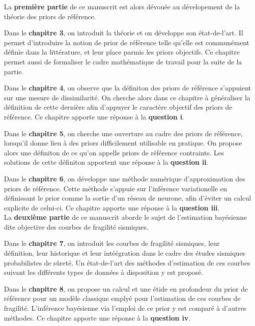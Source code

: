 



La \textbf{première partie} de ce manuscrit est alors dévouée au dévelopement de la théorie des priors de référence.

\noindent
Dans le \textbf{chapitre 3}, on introduit la théorie et on développe son état-de-l'art. Il permet d'introduire la notion de prior de référence telle qu'elle est communément définie dans la littérature, et leur place parmis les priors objectifs. Ce chapitre permet aussi de formaliser le cadre mathématique de travail pour la suite de la partie.

\noindent
Dans le \textbf{chapitre 4}, on observe que la définiton des priors de référence s'appuient sur une mesure de dissimilarité. On cherche alors dans ce chapitre à généraliser la définition de cette dernière afin d'appuyer le caractère objectif des priors de référence. Ce chapitre apporte une réponse à la \textbf{question i}.

\noindent
Dans le \textbf{chapitre 5}, on cherche une ouverture au cadre des priors de référence, lorsqu'il donne lieu à des priors difficilement utilisable en pratique. On propose alors une définiton de ce qu'on appelle priors de référence contraints. Les solutions de cette définiton apportent une réponse à la \textbf{question ii}.

\noindent
Dans le \textbf{chapitre 6}, on développe une méthode numérique d'approximation des priors de référence. Cette méthode s'appuie sur l'inférence variationelle en définissant le prior comme la sortie d'un réseau de neurone, afin d'éviter un calcul explicite de celui-ci. Ce chapitre apporte une réponse à la \textbf{question iii}. \\


La \textbf{deuxième partie} de ce manuscrit aborde le sujet de l'estimation bayésienne dite objective des courbes de fragilité sismiques.

\noindent
Dans le \textbf{chapitre 7}, on introduit les courbes de fragilité sismiques, leur définition, leur historique et leur intéégration dans le cadre des études sismiques probabilistes de sûreté. Un état-de-l'art des méthodes d'estimation de ces courbes suivant les différents types de données à disposition y est proposé.

\noindent
Dans le \textbf{chapitre 8}, on propose un calcul et une étide en profondeur du prior de référence pour un modèle classique emplyé pour l'estimation de ces courbes de fragilité. L'inférence bayésienne via l'emploi de ce prior y est comparé à d'autres méthodes. Ce chapitre apporte une réponse à la \textbf{question iv}.

